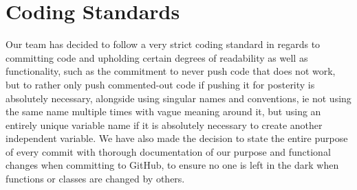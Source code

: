 \documentclass{article}
\begin{document}
\section{Coding Standards}
Our team has decided to follow a very strict coding standard in regards to committing code and upholding certain degrees of readability as well as functionality, such as the commitment to never push code that does not work, but to rather only push commented-out code if pushing it for posterity is absolutely necessary, alongside using singular names and conventions, ie not using the same name multiple times with vague meaning around it, but using an entirely unique variable name if it is absolutely necessary to create another independent variable. We have also made the decision to state the entire purpose of every commit with thorough documentation of our purpose and functional changes when committing to GitHub, to ensure no one is left in the dark when functions or classes are changed by others.
\end{document}
